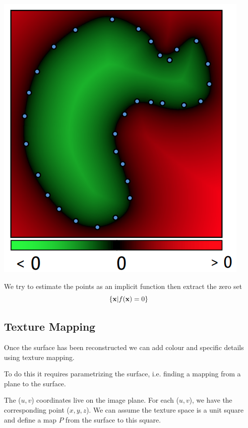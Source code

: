 \documentclass{article}
\begin{document}
\begin{minipage}{0.3\textwidth}
    \centering
    \includegraphics[width=0.9\linewidth]{images/implicit_approximation.png}
\end{minipage}
\begin{minipage}{0.6\textwidth}
    We try to estimate the points as an implicit function then extract the zero set 
    \[
        \{ \text{\textbf{x}} | f(\text{\textbf{x}}) = 0 \}
    \]
\end{minipage}




\vspace{5px}

\newpage

\subsection{Texture Mapping}

Once the surface has been reconstructed we can add colour and specific details using texture mapping.

To do this it requires parametrizing the surface, i.e. finding a mapping from a plane to the surface.

\vspace{5px}

The (\(u,v\)) coordinates live on the image plane. For each (\(u,v\)), we have the corresponding point 
(\(x, y, z\)). We can assume the texture space is a unit square and define a map \(P\) from the surface
to this square.
\end{document}
